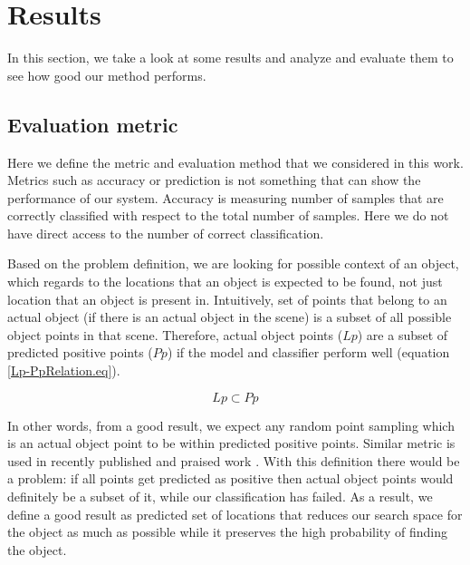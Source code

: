 \section{Results}
\label{Results.sec}
In this section, we take a look at some results and analyze and evaluate them to see how good our method performs.

\subsection{Evaluation metric}
\label{EvaluationMetric.ssec}


Here we define the metric and evaluation method that we considered in this work.
Metrics such as accuracy or prediction is not something that can show the performance of our system.
Accuracy is measuring number of samples that are correctly classified with respect to the total number of samples.
Here we do not have direct access to the number of correct classification. 

Based on the problem definition, we are looking for possible context of an object, which regards to the locations that an 
object is expected to be found, not just location that an object is present in.
Intuitively, set of points that belong to an actual object (if there is an actual object in the scene) is a subset of all 
possible object points in that scene.
Therefore, actual object points ($Lp$) are a subset of predicted positive points ($Pp$) if the model and classifier perform 
well (equation \ref{Lp-PpRelation.eq}).

\begin{equation}
 \label{Lp-PpRelation.eq}
 Lp \subset Pp
\end{equation}

In other words, from a good result, we expect any random point sampling which is an actual object point to be within 
predicted positive points.
Similar metric is used in recently published and praised work \cite{aydemir2012_3Dcontext}.
With this definition there would be a problem: if all points get predicted as positive then actual object points would 
definitely be a subset of it, while our classification has failed.
As a result, we define a good result as predicted set of locations that reduces our search space for the object as much as 
possible while it preserves the high probability of finding the object.

